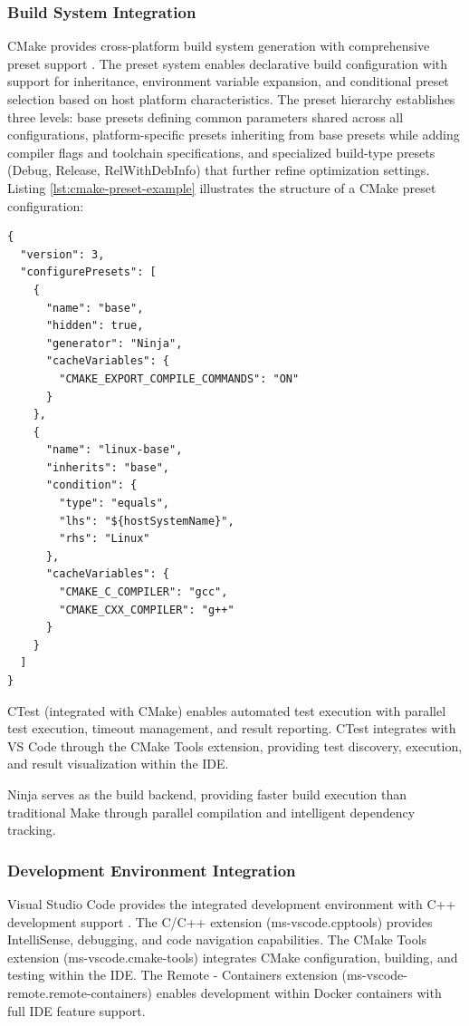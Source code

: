\subsubsection{Build System Integration}

CMake provides cross-platform build system generation with comprehensive preset support \citep{swidzinskiModernCMakeEffortlessly2024}.
The preset system enables declarative build configuration with support for inheritance, environment variable expansion, and conditional preset selection based on host platform characteristics.
The preset hierarchy establishes three levels: base presets defining common parameters shared across all configurations, platform-specific presets inheriting from base presets while adding compiler flags and toolchain specifications, and specialized build-type presets (Debug, Release, RelWithDebInfo) that further refine optimization settings.
Listing \ref{lst:cmake-preset-example} illustrates the structure of a CMake preset configuration:

\begin{lstlisting}[caption={CMake Preset Configuration Structure},label=lst:cmake-preset-example]
{
  "version": 3,
  "configurePresets": [
    {
      "name": "base",
      "hidden": true,
      "generator": "Ninja",
      "cacheVariables": {
        "CMAKE_EXPORT_COMPILE_COMMANDS": "ON"
      }
    },
    {
      "name": "linux-base",
      "inherits": "base",
      "condition": {
        "type": "equals",
        "lhs": "${hostSystemName}",
        "rhs": "Linux"
      },
      "cacheVariables": {
        "CMAKE_C_COMPILER": "gcc",
        "CMAKE_CXX_COMPILER": "g++"
      }
    }
  ]
}
\end{lstlisting}

CTest (integrated with CMake) enables automated test execution with parallel test execution, timeout management, and result reporting.
CTest integrates with VS Code through the CMake Tools extension, providing test discovery, execution, and result visualization within the IDE.

Ninja serves as the build backend, providing faster build execution than traditional Make through parallel compilation and intelligent dependency tracking.

\subsubsection{Development Environment Integration}

Visual Studio Code provides the integrated development environment with C++ development support \citep{microsoftDevelopingContainer2025}.
The C/C++ extension (ms-vscode.cpptools) provides IntelliSense, debugging, and code navigation capabilities.
The CMake Tools extension (ms-vscode.cmake-tools) integrates CMake configuration, building, and testing within the IDE.
The Remote - Containers extension (ms-vscode-remote.remote-containers) enables development within Docker containers with full IDE feature support.

